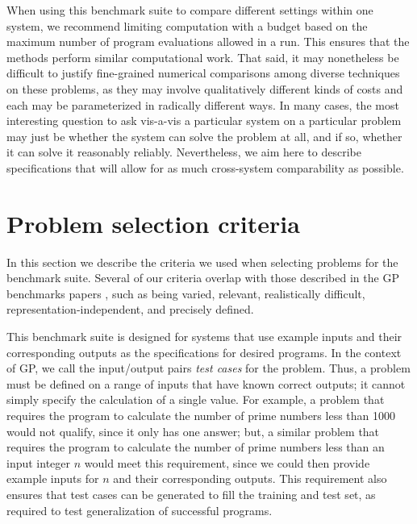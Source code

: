 \documentclass{sig-alternate}
\begin{document}

When using this benchmark suite to compare different settings within one system, we recommend limiting computation with a budget based on the maximum number of program evaluations allowed in a run. This ensures that the methods perform similar computational work. That said, it may nonetheless be difficult to justify fine-grained numerical comparisons among diverse techniques on these problems, as they may involve qualitatively different kinds of costs and each may be parameterized in radically different ways. In many cases, the most interesting question to ask vis-a-vis a particular system on a particular problem may just be whether the system can solve the problem at all, and if so,  whether it can solve it reasonably reliably. Nevertheless, we aim here to describe specifications that will allow for as much cross-system comparability as possible. %


\section{Problem selection criteria} \label{requirements}

In this section we describe the criteria we used when selecting problems for the benchmark suite. Several of our criteria overlap with those described in the GP benchmarks papers \cite{McDermott:2012:GECCO, White:2013:BGB:2441218.2441242}, such as being varied, relevant, realistically difficult, representation-independent, and precisely defined. 

This benchmark suite is designed for systems that use example inputs and their corresponding outputs as the specifications for desired programs. In the context of GP, we call the input/output pairs \textit{test cases} for the problem. Thus, a problem must be defined on a range of inputs that have known correct outputs; it cannot simply specify the calculation of a single value. For example, a problem that requires the program to calculate the number of prime numbers less than 1000 would not qualify, since it only has one answer; but, a similar problem that requires the program to calculate the number of prime numbers less than an input integer $n$ would meet this requirement, since we could then provide example inputs for $n$ and their corresponding outputs. This requirement also ensures that test cases can be generated to fill the training and test set, as required to test generalization of successful programs.
\end{document}
